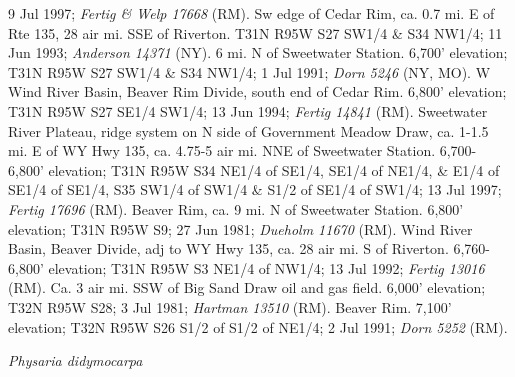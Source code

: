 9 Jul 1997; \textit{Fertig \& Welp 17668} (RM).  Sw edge of Cedar Rim, ca. 0.7 mi. E of Rte 135, 28 air mi. SSE of Riverton.  T31N R95W S27 SW1/4 \& S34 NW1/4; 11 Jun 1993; \textit{Anderson 14371} (NY).  6 mi. N of Sweetwater Station. 6,700' elevation; T31N R95W S27 SW1/4 \& S34 NW1/4; 1 Jul 1991; \textit{Dorn 5246} (NY, MO).  W Wind River Basin, Beaver Rim Divide, south end of Cedar Rim. 6,800' elevation; T31N R95W S27 SE1/4 SW1/4; 13 Jun 1994; \textit{Fertig 14841} (RM).  Sweetwater River Plateau, ridge system on N side of Government Meadow Draw, ca. 1-1.5 mi. E of WY Hwy 135, ca. 4.75-5 air mi. NNE of Sweetwater Station. 6,700-6,800' elevation; T31N R95W S34 NE1/4 of SE1/4, SE1/4 of NE1/4, \& E1/4 of SE1/4 of SE1/4, S35 SW1/4 of SW1/4 \& S1/2 of SE1/4 of SW1/4; 13 Jul 1997; \textit{Fertig 17696} (RM).  Beaver Rim, ca. 9 mi. N of Sweetwater Station. 6,800' elevation; T31N R95W S9; 27 Jun 1981; \textit{Dueholm 11670} (RM).  Wind River Basin, Beaver Divide, adj to WY Hwy 135, ca. 28 air mi. S of Riverton. 6,760-6,800' elevation; T31N R95W S3 NE1/4 of NW1/4; 13 Jul 1992; \textit{Fertig 13016} (RM).  Ca. 3 air mi. SSW of Big Sand Draw oil and gas field. 6,000' elevation; T32N R95W S28; 3 Jul 1981; \textit{Hartman 13510} (RM).  Beaver Rim. 7,100' elevation; T32N R95W S26 S1/2 of S1/2 of NE1/4; 2 Jul 1991; \textit{Dorn 5252} (RM).

\begin{center}
\textit{Physaria didymocarpa}
\end{center}

